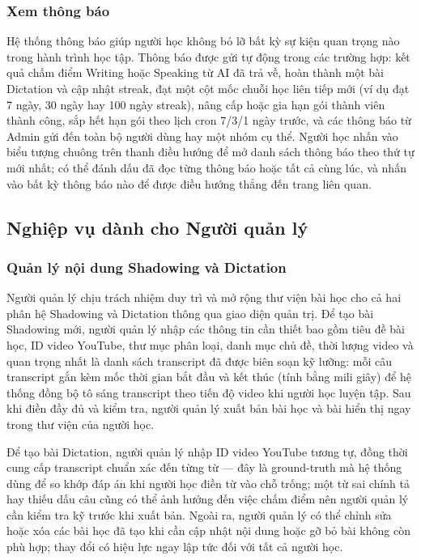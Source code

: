 \subsubsection{Xem thông báo}

Hệ thống thông báo giúp người học không bỏ lỡ bất kỳ sự kiện quan trọng nào trong hành trình học tập. Thông báo được gửi tự động trong các trường hợp: kết quả chấm điểm Writing hoặc Speaking từ AI đã trả về, hoàn thành một bài Dictation và cập nhật streak, đạt một cột mốc chuỗi học liên tiếp mới (ví dụ đạt 7 ngày, 30 ngày hay 100 ngày streak), nâng cấp hoặc gia hạn gói thành viên thành công, sắp hết hạn gói theo lịch cron 7/3/1 ngày trước, và các thông báo từ Admin gửi đến toàn bộ người dùng hay một nhóm cụ thể. Người học nhấn vào biểu tượng chuông trên thanh điều hướng để mở danh sách thông báo theo thứ tự mới nhất; có thể đánh dấu đã đọc từng thông báo hoặc tất cả cùng lúc, và nhấn vào bất kỳ thông báo nào để được điều hướng thẳng đến trang liên quan.

\subsection{Nghiệp vụ dành cho Người quản lý}

\subsubsection{Quản lý nội dung Shadowing và Dictation}

Người quản lý chịu trách nhiệm duy trì và mở rộng thư viện bài học cho cả hai phân hệ Shadowing và Dictation thông qua giao diện quản trị. Để tạo bài Shadowing mới, người quản lý nhập các thông tin cần thiết bao gồm tiêu đề bài học, ID video YouTube, thư mục phân loại, danh mục chủ đề, thời lượng video và quan trọng nhất là danh sách transcript đã được biên soạn kỹ lưỡng: mỗi câu transcript gắn kèm mốc thời gian bắt đầu và kết thúc (tính bằng mili giây) để hệ thống đồng bộ tô sáng transcript theo tiến độ video khi người học luyện tập. Sau khi điền đầy đủ và kiểm tra, người quản lý xuất bản bài học và bài hiển thị ngay trong thư viện của người học.

Để tạo bài Dictation, người quản lý nhập ID video YouTube tương tự, đồng thời cung cấp transcript chuẩn xác đến từng từ --- đây là ground-truth mà hệ thống dùng để so khớp đáp án khi người học điền từ vào chỗ trống; một từ sai chính tả hay thiếu dấu câu cũng có thể ảnh hưởng đến việc chấm điểm nên người quản lý cần kiểm tra kỹ trước khi xuất bản. Ngoài ra, người quản lý có thể chỉnh sửa hoặc xóa các bài học đã tạo khi cần cập nhật nội dung hoặc gỡ bỏ bài không còn phù hợp; thay đổi có hiệu lực ngay lập tức đối với tất cả người học.

